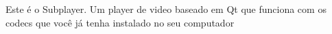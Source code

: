 Este é o Subplayer. Um player de video baseado em Qt que funciona com os codecs que você já tenha instalado no seu computador 